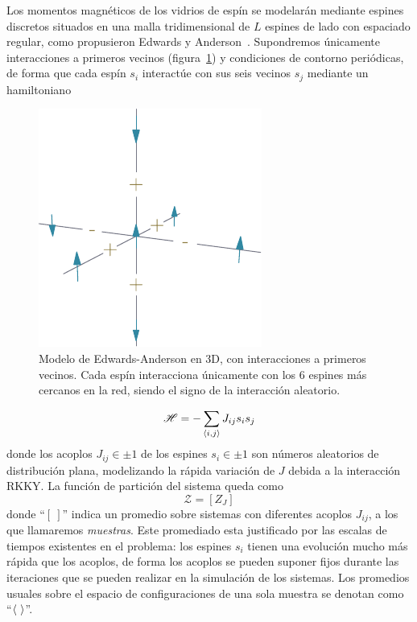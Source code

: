 \documentclass[11pt]{report}
\newcommand{\Ham}{\mathscr{H}}
\begin{document}
Los momentos magnéticos de los vidrios de espín se modelarán mediante
espines discretos situados en una malla tridimensional de $L$ espines
de lado con espaciado regular, como propusieron Edwards y
Anderson~\cite{mranderson}. Supondremos únicamente interacciones a
primeros vecinos (figura~\ref{fig:EA}) y condiciones de contorno
periódicas, de forma que cada espín $s_i$ interactúe con sus seis
vecinos $s_j$ mediante un hamiltoniano
\begin{figure}
  \centering
  \includegraphics{../study_cases/EAfigure/EAfigure.pdf}
  \caption{Modelo de Edwards-Anderson en 3D, con interacciones a
    primeros vecinos. Cada espín interacciona únicamente con los 6
    espines más cercanos en la red, siendo el signo de la interacción
    aleatorio.}
  \label{fig:EA}
\end{figure}
\begin{equation}
  \Ham = - \sum_{\expval{i,j}}  J_{ij} s_i s_j
\end{equation}
donde los acoplos $J_{ij}∈\pm1$ de los espines $s_i∈\pm1$ son
números aleatorios de distribución plana, modelizando la rápida
variación de $J$ debida a la interacción RKKY. La función de
partición del sistema queda como
\begin{equation}
  \mathcal{Z} = [Z_J]
\end{equation}
donde ``$[\ ]$'' indica un promedio sobre sistemas con diferentes
acoplos $J_{ij}$, a los que llamaremos \textit{muestras}. Este
promediado esta justificado por las escalas de tiempos existentes en
el problema: los espines $s_i$ tienen una evolución mucho más rápida
que los acoplos, de forma los acoplos se pueden suponer fijos durante
las iteraciones que se pueden realizar en la simulación de los
sistemas. Los promedios usuales sobre el espacio de configuraciones de
una sola muestra se denotan como ``$\expval{\ }$''.
\end{document}
